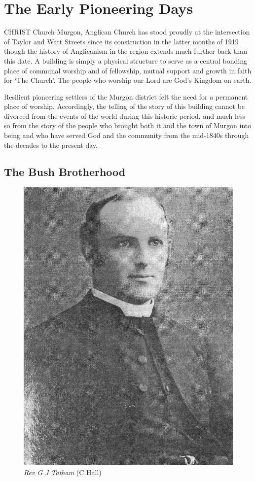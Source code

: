 

\chapter{The Early Pioneering Days}
\nobalance


\lettrine[lines=3]{C}{HRIST}
 Church Murgon, Anglican Church has stood proudly at the intersection of Taylor and Watt Streets since its construction in the latter months of 1919 though the history of Anglicanism in the region extends much further back than this date. A building is simply a physical structure to serve as a central bonding place of communal worship and of fellowship, mutual support and growth in faith for `The Church'. The people who worship our Lord are God's Kingdom on earth.

Resilient pioneering settlers of the Murgon district felt the need for a permanent place of worship. Accordingly, the telling of the story of this building cannot be divorced from the events of the world during this historic period, and much less so from the story of the people who brought both it and the town of Murgon into being and who have served God and the community from the mid-1840s through the decades to the present day.



\section{The Bush Brotherhood}









\begin{figure}
\begin{center}
\includegraphics[width=.5\linewidth,center]{../images/RGTatham.jpg}
\caption{{\itshape Rev G J Tatham} {\scriptsize(C Hall)}}
\end{center}
\end{figure}




